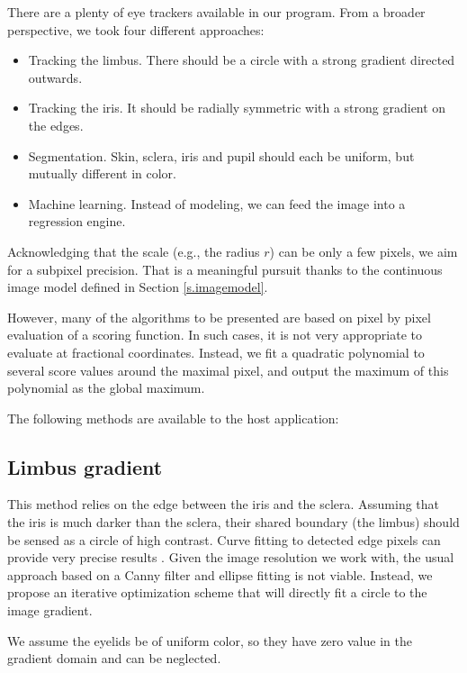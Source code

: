 
There are a plenty of eye trackers available in our program.
From a broader perspective, we took four different approaches:
\begin{itemize}
\item Tracking the limbus. There should be a circle with a strong gradient directed outwards.
\item Tracking the iris. It should be radially symmetric with a strong gradient on the edges.
\item Segmentation. Skin, sclera, iris and pupil should each be uniform, but mutually different in color.
\item Machine learning. Instead of modeling, we can feed the image into a regression engine.
\end{itemize}

Acknowledging that the scale (e.g., the radius $r$) can be only a few pixels, we aim for a subpixel precision.
That is a meaningful pursuit thanks to the continuous image model defined in Section \ref{s.imagemodel}.

However, many of the algorithms to be presented are based on pixel by pixel evaluation of a scoring function.
In such cases, it is not very appropriate to evaluate at fractional coordinates.
Instead, we fit a quadratic polynomial to several score values around the maximal pixel, and output the maximum of this polynomial as the global maximum.

The following methods are available to the host application:

\subsection{Limbus gradient}
This method relies on the edge between the iris and the sclera.
Assuming that the iris is much darker than the sclera, their shared boundary (the limbus) should be sensed as a circle of high contrast.
Curve fitting to detected edge pixels can provide very precise results \cite{kassner14}.
Given the image resolution we work with, the usual approach based on a Canny filter and ellipse fitting is not viable.
Instead, we propose an iterative optimization scheme that will directly fit a circle to the image gradient.

We assume the eyelids be of uniform color, so they have zero value in the gradient domain and can be neglected.

